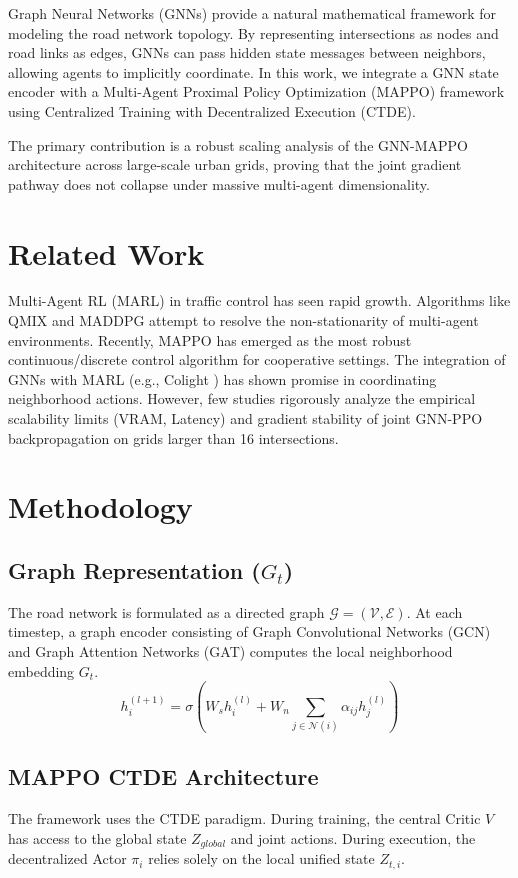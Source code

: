 \documentclass{ieeeaccess}
\begin{document}
Graph Neural Networks (GNNs) provide a natural mathematical framework for modeling the road network topology. By representing intersections as nodes and road links as edges, GNNs can pass hidden state messages between neighbors, allowing agents to implicitly coordinate. In this work, we integrate a GNN state encoder with a Multi-Agent Proximal Policy Optimization (MAPPO) framework using Centralized Training with Decentralized Execution (CTDE).

The primary contribution is a robust scaling analysis of the GNN-MAPPO architecture across large-scale urban grids, proving that the joint gradient pathway does not collapse under massive multi-agent dimensionality.

\section{Related Work}
\label{sec:related_work}
Multi-Agent RL (MARL) in traffic control has seen rapid growth. Algorithms like QMIX and MADDPG attempt to resolve the non-stationarity of multi-agent environments. Recently, MAPPO has emerged as the most robust continuous/discrete control algorithm for cooperative settings. The integration of GNNs with MARL (e.g., Colight \cite{placeholder9}) has shown promise in coordinating neighborhood actions. However, few studies rigorously analyze the empirical scalability limits (VRAM, Latency) and gradient stability of joint GNN-PPO backpropagation on grids larger than 16 intersections.

\section{Methodology}
\label{sec:methodology}

\subsection{Graph Representation ($G_t$)}
The road network is formulated as a directed graph $\mathcal{G} = (\mathcal{V}, \mathcal{E})$. At each timestep, a graph encoder consisting of Graph Convolutional Networks (GCN) and Graph Attention Networks (GAT) computes the local neighborhood embedding $G_t$.
$$ h_i^{(l+1)} = \sigma \left( W_s h_i^{(l)} + W_n \sum_{j \in \mathcal{N}(i)} \alpha_{ij} h_j^{(l)} \right) $$

\subsection{MAPPO CTDE Architecture}
The framework uses the CTDE paradigm. During training, the central Critic $V$ has access to the global state $Z_{global}$ and joint actions. During execution, the decentralized Actor $\pi_i$ relies solely on the local unified state $Z_{t, i}$.
\end{document}
